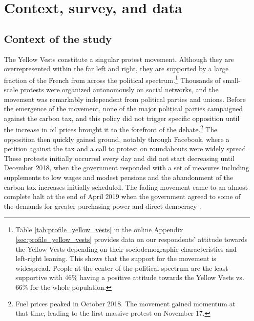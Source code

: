 \documentclass[12pt]{article} %
\begin{document}
\section{Context, survey, and data} \label{sec:survey}

\subsection{Context of the study \label{subsec:context}}



The Yellow Vests constitute a singular protest movement. Although they are overrepresented within the far left and right, they are supported by a large fraction of the French from across the political spectrum.\footnote{Table \ref{tab:profile_yellow_vests} in the online Appendix \ref{sec:profile_yellow_vests} provides data on our respondents' attitude towards the Yellow Vests depending on their sociodemographic characteristics and left-right leaning. This shows that the support for the movement is widespread. People at the center of the political spectrum are the least supportive with 46\% having a positive attitude towards the Yellow Vests vs. 66\% for the whole population.} Thousands of small-scale protests were organized autonomously on social networks, and the movement was remarkably independent from political parties and unions. Before the emergence of the movement, none of the major political parties campaigned against the carbon tax, and this policy did not trigger specific opposition until the increase in oil prices brought it to the forefront of the debate.\footnote{Fuel prices peaked in October 2018. The movement gained momentum at that time, leading to the first massive protest on November 17.} The opposition then quickly gained ground, notably through Facebook, where a petition against the tax and a call to protest on roundabouts were widely spread. These protests initially occurred every day and did not start decreasing until December 2018, when the government responded with a set of measures including supplements to low wages and modest pensions and the abandonment of the carbon tax increases initially scheduled. The fading movement came to an almost complete halt at the end of April 2019 when the government agreed to some of the demands for greater purchasing power and direct democracy \citep{boyer_les_2020}.
\end{document}
